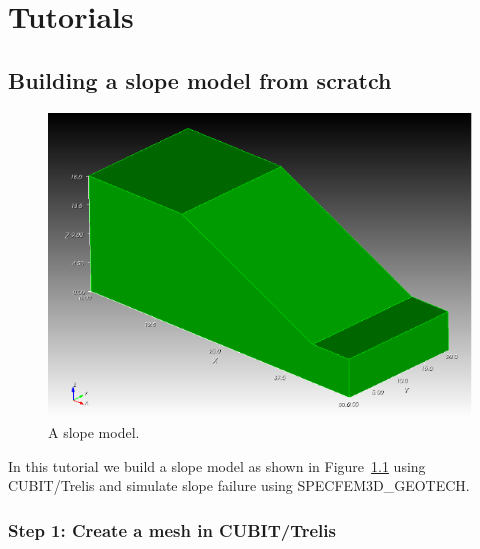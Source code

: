\chapter{Tutorials}
\label{chap:tutorials}

\section{Building a slope model from scratch}
\label{sec:cubit}

\begin{figure}[ht]
\centering
\includegraphics[scale=0.4]{slope_model}
\caption{A slope model.}
\label{fig:slope}
\end{figure}

In this tutorial we build a slope model as shown in Figure~\ref{fig:slope} using CUBIT/Trelis and simulate slope failure using SPECFEM3D\_GEOTECH.

\subsection*{Step 1: Create a mesh in CUBIT/Trelis}

